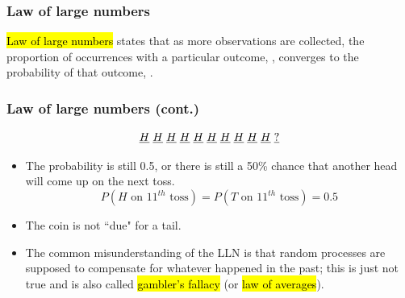\documentclass[11pt,containsverbatim,handout]{beamer}
\begin{document}

\begin{frame}
\frametitle{Law of large numbers}

\hl{Law of large numbers} states that as more observations are collected, the proportion of occurrences with a particular outcome, , converges to the probability of that outcome, .

\end{frame}


\begin{frame}
\frametitle{Law of large numbers (cont.)}


\[ \underline{H} \hspace{1mm} \underline{H} \hspace{1mm} \underline{H} \hspace{1mm} \underline{H} \hspace{1mm} \underline{H} \hspace{1mm} \underline{H} \hspace{1mm} \underline{H} \hspace{1mm} \underline{H} \hspace{1mm} \underline{H} \hspace{1mm} \underline{H} \hspace{1mm} \underline{?} \]

\begin{itemize}
\item<2-> The probability is still 0.5, or there is still a 50\% chance that another head will come up on the next toss.
\[ P(H \text{ on 11}^{th} \text{ toss}) = P(T \text{ on 11}^{th} \text{ toss}) = 0.5 \]
\item<3-> The coin is not ``due" for a tail.
\item<4-> The common misunderstanding of the LLN is that random processes are supposed to compensate for whatever happened in the past; this is just not true and is also called \hl{gambler's fallacy} (or \hl{law of averages}).
\end{itemize}

\end{frame}

\end{document}
